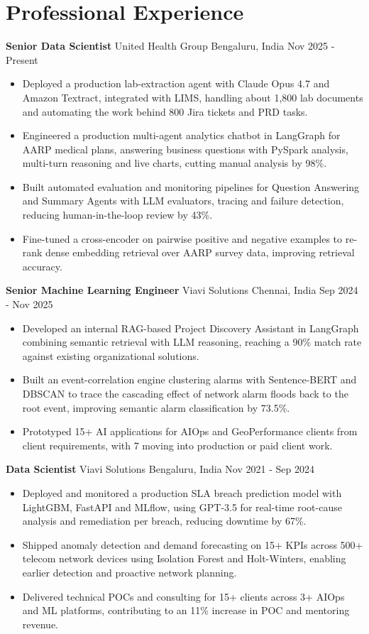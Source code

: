 \documentclass[10pt,a4paper]{article}
\newcommand{\role}[4]{\textbf{#1} \textbar{} #2 \hfill #3 \textbar{} #4\par}
\begin{document}
\section{Professional Experience}
\role{Senior Data Scientist}{United Health Group}{Bengaluru, India}{Nov 2025 - Present}
\begin{itemize}
  \item Deployed a production lab-extraction agent with Claude Opus 4.7 and Amazon Textract, integrated with LIMS, handling about 1,800 lab documents and automating the work behind 800 Jira tickets and PRD tasks.
  \item Engineered a production multi-agent analytics chatbot in LangGraph for AARP medical plans, answering business questions with PySpark analysis, multi-turn reasoning and live charts, cutting manual analysis by 98\%.
  \item Built automated evaluation and monitoring pipelines for Question Answering and Summary Agents with LLM evaluators, tracing and failure detection, reducing human-in-the-loop review by 43\%.
  \item Fine-tuned a cross-encoder on pairwise positive and negative examples to re-rank dense embedding retrieval over AARP survey data, improving retrieval accuracy.
\end{itemize}
\vspace{3pt}
\role{Senior Machine Learning Engineer}{Viavi Solutions}{Chennai, India}{Sep 2024 - Nov 2025}
\begin{itemize}
  \item Developed an internal RAG-based Project Discovery Assistant in LangGraph combining semantic retrieval with LLM reasoning, reaching a 90\% match rate against existing organizational solutions.
  \item Built an event-correlation engine clustering alarms with Sentence-BERT and DBSCAN to trace the cascading effect of network alarm floods back to the root event, improving semantic alarm classification by 73.5\%.
  \item Prototyped 15+ AI applications for AIOps and GeoPerformance clients from client requirements, with 7 moving into production or paid client work.
\end{itemize}
\vspace{3pt}
\role{Data Scientist}{Viavi Solutions}{Bengaluru, India}{Nov 2021 - Sep 2024}
\begin{itemize}
  \item Deployed and monitored a production SLA breach prediction model with LightGBM, FastAPI and MLflow, using GPT-3.5 for real-time root-cause analysis and remediation per breach, reducing downtime by 67\%.
  \item Shipped anomaly detection and demand forecasting on 15+ KPIs across 500+ telecom network devices using Isolation Forest and Holt-Winters, enabling earlier detection and proactive network planning.
  \item Delivered technical POCs and consulting for 15+ clients across 3+ AIOps and ML platforms, contributing to an 11\% increase in POC and mentoring revenue.
\end{itemize}
\end{document}
